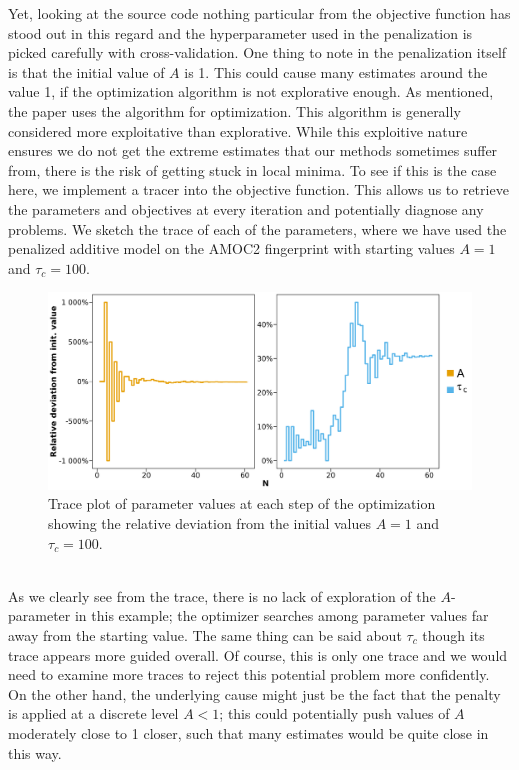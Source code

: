 Yet, looking at the source code nothing particular from the objective function has stood out in this regard and the hyperparameter used in the penalization is picked carefully with cross-validation. One thing to note in the penalization itself is that the initial value of $A$ is 1. This could cause many estimates around the value 1, if the optimization algorithm is not explorative enough. As mentioned, the paper uses the  algorithm for optimization. This algorithm is generally considered more exploitative than explorative. While this exploitive nature ensures we do not get the extreme estimates that our methods sometimes suffer from, there is the risk of getting stuck in local minima. To see if this is the case here, we implement a tracer into the objective function. This allows us to retrieve the parameters and objectives at every iteration and potentially diagnose any problems. We sketch the trace of each of the parameters, where we have used the penalized additive model on the AMOC2 fingerprint with starting values $A = 1$ and $\tau_c = 100$. 
\begin{figure}[h!]
\begin{center}
    \includegraphics[scale = .075]{figures/trace_plot.jpeg}
    \caption{Trace plot of parameter values at each step of the optimization showing the relative deviation from the initial values $A = 1$ and $\tau_c = 100$.}
    \label{figure:trace_plot}
\end{center}
\end{figure}\\
As we clearly see from the trace, there is no lack of exploration of the $A$-parameter in this example; the optimizer searches among parameter values far away from the starting value. The same thing can be said about $\tau_c$ though its trace appears more guided overall. Of course, this is only one trace and we would need to examine more traces to reject this potential problem more confidently. On the other hand, the underlying cause might just be the fact that the penalty is applied at a discrete level $A<1$; this could potentially push values of $A$ moderately close to 1 closer, such that many estimates would be quite close in this way.

